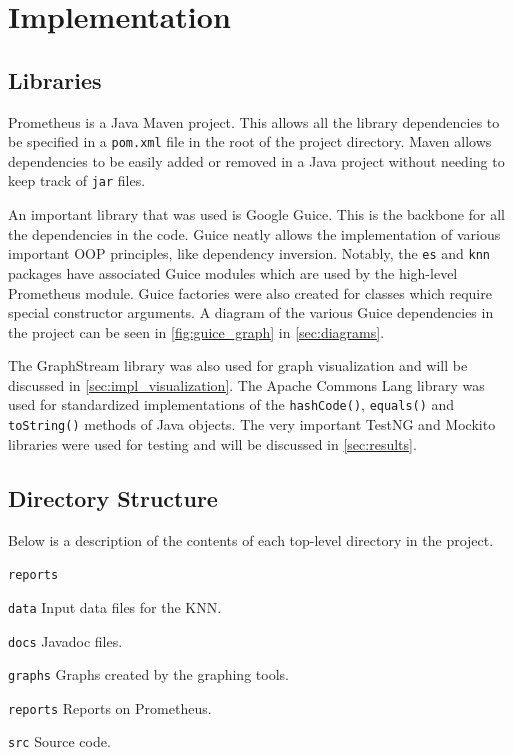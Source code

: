 \documentclass[titlepage,11pt]{article}
\newcommand{\code}[1]{\texttt{#1}}
\begin{document}
\section{Implementation}
\label{sec:implementation}

\subsection{Libraries}
Prometheus is a Java Maven project. This allows all the library dependencies to be specified in a \code{pom.xml} file in the root of the project directory. Maven allows dependencies to be easily added or removed in a Java project without needing to keep track of \code{jar} files.

An important library that was used is Google Guice. This is the backbone for all the dependencies in the code. Guice neatly allows the implementation of various important OOP principles, like dependency inversion. Notably, the \code{es} and \code{knn} packages have associated Guice modules which are used by the high-level Prometheus module. Guice factories were also created for classes which require special constructor arguments. A diagram of the various Guice dependencies in the project can be seen in \cref{fig:guice_graph} in \cref{sec:diagrams}.

The GraphStream library was also used for graph visualization and will be discussed in \cref{sec:impl_visualization}. The Apache Commons Lang library was used for standardized implementations of the \code{hashCode()}, \code{equals()} and \code{toString()} methods of Java objects. The very important TestNG and Mockito libraries were used for testing and will be discussed in \cref{sec:results}.

\subsection{Directory Structure}
Below is a description of the contents of each top-level directory in the project.

\begin{labeling}{\code{reports}}
	\item[\code{data}] Input data files for the KNN.
	\item[\code{docs}] Javadoc files.
	\item[\code{graphs}] Graphs created by the graphing tools.
	\item[\code{reports}] Reports on Prometheus.
	\item[\code{src}] Source code.
\end{labeling}
\end{document}
